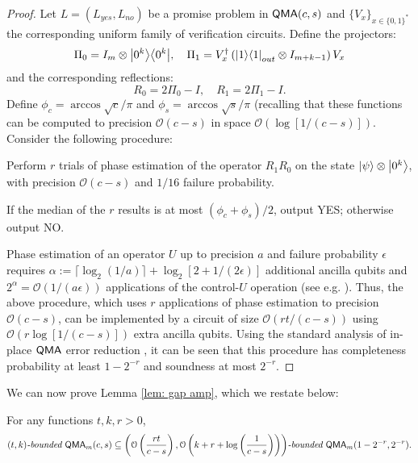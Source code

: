 \documentclass[a4paper,UKenglish]{lipics-v2016}
\newcommand\QMA{{\sf{QMA}}}
\newcommand\bddQMA[5]{{\left(#1,#2\right)}\textit{-bounded }\QMA_{#3}(#4,#5)}
\newcommand\bigoh{\mathcal{O}}
\begin{document}
\begin{proof}
	Let $L=(L_{yes}, L_{no})$ be a promise problem in $\QMA(c,s)$ and $\{V_x\}_{x\in\{0,1\}^*}$ the corresponding uniform family of verification circuits.
Define the projectors:
\begin{align}
\Pi_0 = I_m \otimes {\left\vert{0^k}\right\rangle}{\left\langle{0^k}\right\vert}, \quad \Pi_1 = V^\dagger_x \left({\left\vert{1}\right\rangle}{\left\langle{1}\right\vert}_{out} \otimes I_{m+k-1}\right) V_x
\end{align}
and the corresponding reflections:
\begin{equation}
R_0 = 2\Pi_0 - I, \quad R_1 = 2\Pi_1 - I.
\end{equation}
Define $\phi_c = \arccos\sqrt{c}/\pi$ and $\phi_s = \arccos\sqrt{s}/\pi$ (recalling that these functions can be computed to precision $\bigoh (c-s)$ in space $\bigoh (\log[1/(c-s)])$. 
Consider the following procedure:
\begin{compactenum}
\item Perform $r$ trials of phase estimation of the operator $R_1R_0$ on the state ${\left\vert{\psi}\right\rangle}\otimes {\left\vert{0^k}\right\rangle}$, with  precision $\mathcal{O}(c-s)$ and $1/16$ failure probability. 
\item If the median of the $r$ results is at most $(\phi_{c}+\phi_{s})/2$, output YES; otherwise output NO.
\end{compactenum}
Phase estimation of an operator $U$ up to precision $a$ and failure probability $\epsilon$ requires $\alpha := \lceil\log_2(1/a)\rceil + \log_2[2+1/(2\epsilon)]$ additional ancilla qubits and $2^\alpha = \mathcal{O}(1/(a\epsilon))$ applications of the control-$U$ operation (see e.g. \cite{nc00}).  Thus, the above procedure, which uses $r$ applications of phase estimation to precision $\mathcal{O}(c-s)$, can be implemented by a circuit of size $\mathcal{O}(rt/(c-s))$ using $\mathcal{O}(r\log[1/(c-s)])$ extra ancilla qubits. Using the standard analysis of in-place $\QMA$ error reduction \cite{mw05,nwz11}, it can be seen that this procedure has completeness probability at least $1-2^{-r}$ and soundness at most $2^{-r}$.
\end{proof}
We can now prove Lemma \ref{lem: gap amp}, which we restate below:
\begingroup
\def\thetheorem{\ref{lem: gap amp}}
\begin{lemma}
For any functions $t,k,r>0$, 
\[
\bddQMA{t}{k}{m}{c}{s}\subseteq\bddQMA{\mathcal{O}\left(\frac{rt}{c-s}\right)}{\mathcal{O}\left(k+r+\log\left(\frac{1}{c-s}\right)\right)}{m}{1-2^{-r}}{2^{-r}}.
\]
\end{lemma}
\addtocounter{theorem}{-1}
\endgroup
\end{document}
